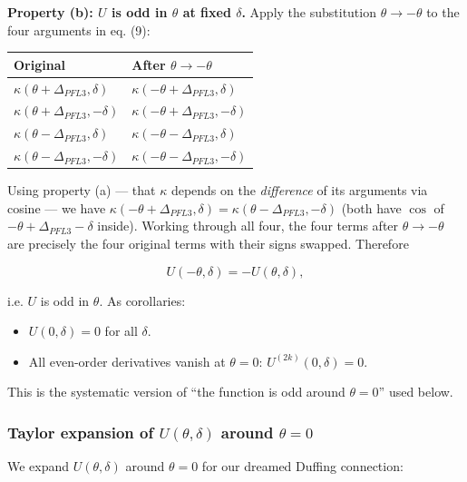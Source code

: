 \documentclass[11pt]{article}
\begin{document}
\textbf{Property (b): $U$ is odd in $\theta$ at fixed $\delta$.} Apply the substitution $\theta \to -\theta$ to the four arguments in eq. (9):

\begin{center}
\begin{tabular}{ll}
\toprule
Original & After $\theta \to -\theta$ \\
\midrule
$\kappa(\theta + \Delta_{PFL3}, \delta)$  & $\kappa(-\theta + \Delta_{PFL3}, \delta)$  \\
$\kappa(\theta + \Delta_{PFL3}, -\delta)$ & $\kappa(-\theta + \Delta_{PFL3}, -\delta)$ \\
$\kappa(\theta - \Delta_{PFL3}, \delta)$  & $\kappa(-\theta - \Delta_{PFL3}, \delta)$  \\
$\kappa(\theta - \Delta_{PFL3}, -\delta)$ & $\kappa(-\theta - \Delta_{PFL3}, -\delta)$ \\
\bottomrule
\end{tabular}
\end{center}

Using property (a) --- that $\kappa$ depends on the \textit{difference} of its arguments via cosine --- we have $\kappa(-\theta + \Delta_{PFL3}, \delta) = \kappa(\theta - \Delta_{PFL3}, -\delta)$ (both have $\cos$ of $-\theta + \Delta_{PFL3} - \delta$ inside). Working through all four, the four terms after $\theta \to -\theta$ are precisely the four original terms with their signs swapped. Therefore

\begin{equation*}
U(-\theta, \delta) = -U(\theta, \delta),
\end{equation*}

i.e. $U$ is odd in $\theta$. As corollaries:

\begin{itemize}
\item $U(0, \delta) = 0$ for all $\delta$.
\item All even-order derivatives vanish at $\theta = 0$: $U^{(2k)}(0, \delta) = 0$.
\end{itemize}

This is the systematic version of ``the function is odd around $\theta = 0$'' used below.

\subsubsection{Taylor expansion of $U(\theta, \delta)$ around $\theta = 0$}

We expand $U(\theta, \delta)$ around $\theta = 0$ for our dreamed Duffing connection:
\end{document}
